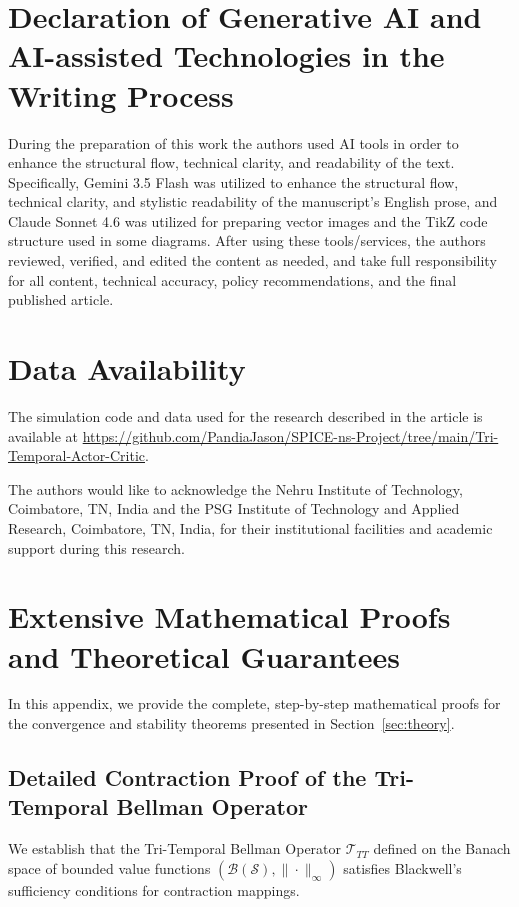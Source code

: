 \documentclass[manuscript, screen, review]{jair}
\begin{document}
\section*{Declaration of Generative AI and AI-assisted Technologies in the Writing Process}
During the preparation of this work the authors used AI tools in order to enhance the structural flow, technical clarity, and readability of the text. Specifically, Gemini 3.5 Flash was utilized to enhance the structural flow, technical clarity, and stylistic readability of the manuscript's English prose, and Claude Sonnet 4.6 was utilized for preparing vector images and the TikZ code structure used in some diagrams. After using these tools/services, the authors reviewed, verified, and edited the content as needed, and take full responsibility for all content, technical accuracy, policy recommendations, and the final published article.

\section*{Data Availability}
The simulation code and data used for the research described in the article is available at \url{https://github.com/PandiaJason/SPICE-ns-Project/tree/main/Tri-Temporal-Actor-Critic}.

\begin{acks}
The authors would like to acknowledge the Nehru Institute of Technology, Coimbatore, TN, India and the PSG Institute of Technology and Applied Research, Coimbatore, TN, India, for their institutional facilities and academic support during this research.
\end{acks}

\printbibliography

\appendix

\section{Extensive Mathematical Proofs and Theoretical Guarantees}\label{app:sec_proofs}
In this appendix, we provide the complete, step-by-step mathematical proofs for the convergence and stability theorems presented in Section~\ref{sec:theory}.

\subsection{Detailed Contraction Proof of the Tri-Temporal Bellman Operator}\label{app:sub_contraction}
We establish that the Tri-Temporal Bellman Operator $\mathcal{T}_{TT}$ defined on the Banach space of bounded value functions $(\mathcal{B}(\mathcal{S}), \|\cdot\|_\infty)$ satisfies Blackwell's sufficiency conditions for contraction mappings.
\end{document}
